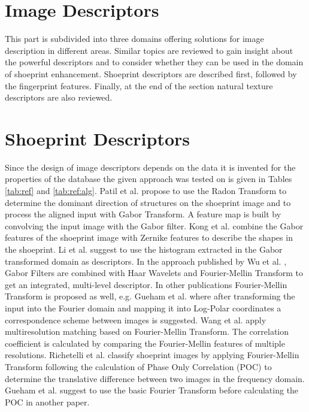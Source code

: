 \documentclass[draft,final]{vutinfth} %
\begin{document}
\section{Image Descriptors}

This part is subdivided into three domains offering solutions for image description in different areas.
Similar topics are reviewed to gain insight about the powerful descriptors and to consider whether they can be used in the domain of shoeprint enhancement.
Shoeprint descriptors are described first, followed by the fingerprint features.
Finally, at the end of the section natural texture descriptors are also reviewed. 

\section*{Shoeprint Descriptors}
\par
Since the design of image descriptors depends on the data it is invented for the properties of the database the given approach was tested on is given in Tables \ref{tab:ref} and \ref{tab:ref:alg}.
Patil et al. \cite{patil2009rotation} propose to use the Radon Transform to determine the dominant direction of structures on the shoeprint image and to process the aligned input with Gabor Transform.
A feature map is built by convolving the input image with the Gabor filter.
Kong et al.  \cite{kong2014novel} combine the Gabor features of the shoeprint image with Zernike features to describe the shapes in the shoeprint.
Li et al. \cite{li2014retrieval} suggest to use the histogram extracted in the Gabor transformed domain as descriptors.
In the approach published by Wu et al.  \cite{wu2019crime}, Gabor Filters are combined with Haar Wavelets and Fourier-Mellin Transform to get an integrated, multi-level descriptor. 
In other publications Fourier-Mellin Transform is proposed as well, e.g. Gueham et al. \cite{gueham2008automatic} where after transforming the input into the Fourier domain and mapping it into Log-Polar coordinates a correspondence scheme between images is suggested.
Wang et al. \cite{wang2014automatic} apply multiresolution matching based on  Fourier-Mellin Transform.
The correlation coefficient is calculated by comparing the Fourier-Mellin features of multiple resolutions.
Richetelli et al. \cite{richetelli2017classification} classify shoeprint images by applying Fourier-Mellin Transform following the calculation of Phase Only Correlation (POC) to determine the translative difference between two images in the frequency domain.
Gueham et al. \cite{gueham2007automatic} suggest to use the basic Fourier Transform before calculating the POC in another paper.
\end{document}
